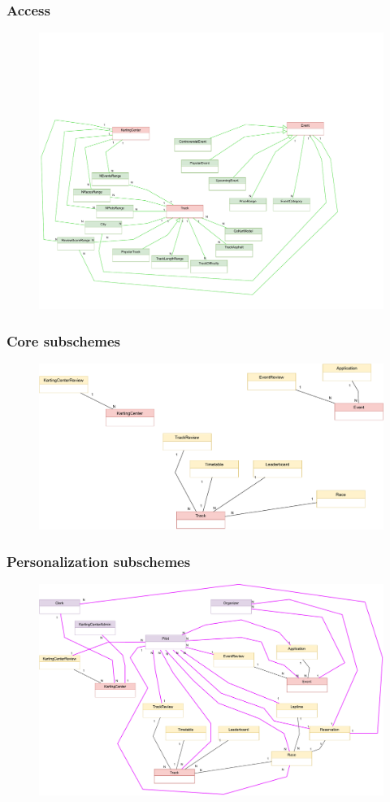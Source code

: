 \documentclass{beamer}
\begin{document}
\begin{frame}
    \frametitle{Access}
    \begin{figure}
        \centering
        \includegraphics[width=0.7\linewidth]{drawio/access-subschemes.pdf}
    \end{figure}
\end{frame}


\begin{frame}
    \frametitle{Core subschemes}
    \begin{figure}
        \centering
        \includegraphics[width=1\linewidth]{drawio/core-subschemes-cropped.pdf}
    \end{figure}
\end{frame}

\begin{frame}
    \frametitle{Personalization subschemes}
    \begin{figure}
        \centering
        \includegraphics[width=1\linewidth]{drawio/personalization-subschemes-cropped.pdf}
    \end{figure}
\end{frame}
\end{document}

